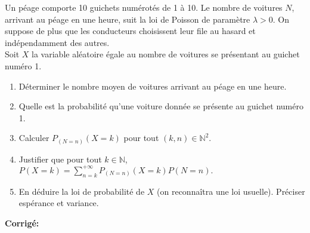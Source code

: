 \documentclass[a4paper,twoside,french,11pt]{VcCours}
\newcommand{\corr}{\textbf{Corrigé:}}
\begin{document}
\begin{Exercice}{} Un péage comporte 10 guichets numérotés de 1 à 10. Le nombre de voitures $N$, arrivant au péage en une heure, suit la loi de Poisson de paramètre $\lambda>0$. On suppose de plus que les conducteurs choisissent leur file au hasard et indépendamment des autres.\\
Soit $X$ la variable aléatoire égale au nombre de voitures se présentant au guichet numéro 1.
\begin{enumerate}
\item Déterminer le nombre moyen de voitures arrivant au péage en une heure.
\item Quelle est la probabilité qu'une voiture donnée se présente au guichet numéro 1.
\item Calculer $P_{(N=n)}(X=k)$ pour tout $(k,n) \in \mathbb{N}^2$.
\item Justifier que pour tout $k \in \mathbb{N}$, ${P(X=k)=\sum_{n=k}^{+\infty}P_{(N=n)}(X=k) P(N=n).}$
\item En déduire la loi de probabilité de $X$ (on reconnaîtra une loi usuelle). Préciser espérance et variance.
\end{enumerate}
\end{Exercice}

\corr 
\end{document}
